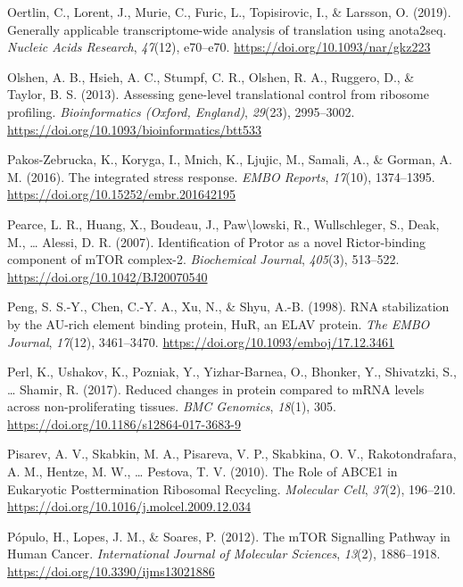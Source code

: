 \documentclass[12pt,openany]{book}
\begin{document}
\hypertarget{ref-Oertlin2019}{}
Oertlin, C., Lorent, J., Murie, C., Furic, L., Topisirovic, I., \&
Larsson, O. (2019). Generally applicable transcriptome-wide analysis of
translation using anota2seq. \emph{Nucleic Acids Research},
\emph{47}(12), e70--e70. \url{https://doi.org/10.1093/nar/gkz223}

\hypertarget{ref-Olshen2013}{}
Olshen, A. B., Hsieh, A. C., Stumpf, C. R., Olshen, R. A., Ruggero, D.,
\& Taylor, B. S. (2013). Assessing gene-level translational control from
ribosome profiling. \emph{Bioinformatics (Oxford, England)},
\emph{29}(23), 2995--3002.
\url{https://doi.org/10.1093/bioinformatics/btt533}

\hypertarget{ref-Pakos-Zebrucka2016}{}
Pakos-Zebrucka, K., Koryga, I., Mnich, K., Ljujic, M., Samali, A., \&
Gorman, A. M. (2016). The integrated stress response. \emph{EMBO
Reports}, \emph{17}(10), 1374--1395.
\url{https://doi.org/10.15252/embr.201642195}

\hypertarget{ref-Pearce2007}{}
Pearce, L. R., Huang, X., Boudeau, J., Paw\textbackslash{}lowski, R.,
Wullschleger, S., Deak, M., \ldots{} Alessi, D. R. (2007).
Identification of Protor as a novel Rictor-binding component of mTOR
complex-2. \emph{Biochemical Journal}, \emph{405}(3), 513--522.
\url{https://doi.org/10.1042/BJ20070540}

\hypertarget{ref-Peng1998}{}
Peng, S. S.-Y., Chen, C.-Y. A., Xu, N., \& Shyu, A.-B. (1998). RNA
stabilization by the AU-rich element binding protein, HuR, an ELAV
protein. \emph{The EMBO Journal}, \emph{17}(12), 3461--3470.
\url{https://doi.org/10.1093/emboj/17.12.3461}

\hypertarget{ref-Perl2017}{}
Perl, K., Ushakov, K., Pozniak, Y., Yizhar-Barnea, O., Bhonker, Y.,
Shivatzki, S., \ldots{} Shamir, R. (2017). Reduced changes in protein
compared to mRNA levels across non-proliferating tissues. \emph{BMC
Genomics}, \emph{18}(1), 305.
\url{https://doi.org/10.1186/s12864-017-3683-9}

\hypertarget{ref-Pisarev2010}{}
Pisarev, A. V., Skabkin, M. A., Pisareva, V. P., Skabkina, O. V.,
Rakotondrafara, A. M., Hentze, M. W., \ldots{} Pestova, T. V. (2010).
The Role of ABCE1 in Eukaryotic Posttermination Ribosomal Recycling.
\emph{Molecular Cell}, \emph{37}(2), 196--210.
\url{https://doi.org/10.1016/j.molcel.2009.12.034}

\hypertarget{ref-Populo2012}{}
Pópulo, H., Lopes, J. M., \& Soares, P. (2012). The mTOR Signalling
Pathway in Human Cancer. \emph{International Journal of Molecular
Sciences}, \emph{13}(2), 1886--1918.
\url{https://doi.org/10.3390/ijms13021886}
\end{document}
